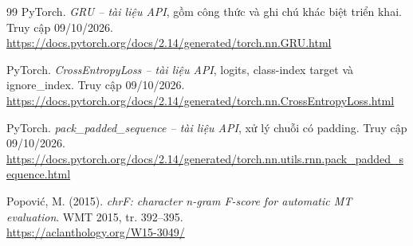 \documentclass[11pt,a4paper]{article}
\numberwithin{equation}{section}
\begin{document}
\begin{thebibliography}{99}
 PyTorch. \emph{GRU -- tài liệu API}, gồm công thức và ghi chú khác biệt triển khai. Truy cập 09/10/2026.\\
\url{https://docs.pytorch.org/docs/2.14/generated/torch.nn.GRU.html}

 PyTorch. \emph{CrossEntropyLoss -- tài liệu API}, logits, class-index target và ignore\_index. Truy cập 09/10/2026.\\
\url{https://docs.pytorch.org/docs/2.14/generated/torch.nn.CrossEntropyLoss.html}

 PyTorch. \emph{pack\_padded\_sequence -- tài liệu API}, xử lý chuỗi có padding. Truy cập 09/10/2026.\\
\url{https://docs.pytorch.org/docs/2.14/generated/torch.nn.utils.rnn.pack_padded_sequence.html}

 Popović, M. (2015). \emph{chrF: character n-gram F-score for automatic MT evaluation}. WMT 2015, tr. 392--395.\\
\url{https://aclanthology.org/W15-3049/}

\end{thebibliography}
\end{document}
